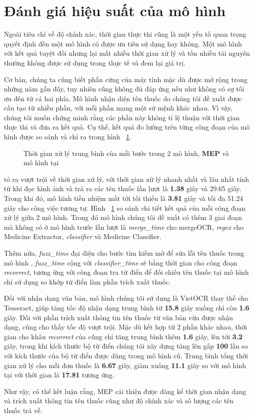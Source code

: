 \section{Đánh giá hiệu suất của mô hình}

Ngoài tiêu chí về độ chính xác, thời gian thực thi cũng là một yếu tố quan trọng quyết định đến một mô hình có được ưu tiên sử dụng hay không. Một mô hình với kết quả tuyệt đối nhưng lại mất nhiều thời gian xử lý và tốn nhiều tài nguyên thường không được sử dụng trong thực tế và đem lại giá trị.

Cơ bản, chúng ta cũng biết phần cứng của máy tính mặc dù được mở rộng trong những năm gần đây, tuy nhiên cũng không đủ đáp ứng nếu như không có sự tối ưu đến từ cả hai phía. Mô hình nhận diện tên thuốc do chúng tôi đề xuất được cấu tạo từ nhiều phần, với mỗi phần mang một sứ mệnh khác nhau. Vì vậy, chúng tôi muốn chứng minh rằng các phần này không tỉ lệ thuận với thời gian thực thi và đưa ra kết quả. Cụ thể, kết quả đo lường trên từng công đoạn của mô hình được so sánh và chỉ ra trong hình ~\ref{exp:barchart}.

\begin{figure}
\centering
\scalebox{0.65}{}
\caption{Thời gian xử lý trung bình của mỗi bước trong 2 mô hình, \textbf{MEP} và mô hình tại \cite{nguyen2021developing}}\label{exp:barchart}
\end{figure}

 tỏ ra vượt trội về thời gian xử lý, với thời gian xử lý nhanh nhất và lâu nhất tính từ khi đọc hình ảnh và trả ra các tên thuốc lần lượt là \textbf{1.38} giây và 29.65 giây. Trong khi đó, mô hình tiền nhiệm mất tới tối thiểu là \textbf{3.81} giây và tối đa 51.24 giây cho công việc tương tự. Hình ~\ref{exp:barchart} so sánh chi tiết kết quả của mỗi công đoạn xử lý giữa 2 mô hình. Trong đó mô hình chúng tôi đề xuất có thêm 3 giai đoạn mà không có ở mô hình trước lần lượt là \textit{merge_time} cho mergeOCR, \textit{regex} cho Medicine Extractor, \textit{classifier} và Medicine Classifier. 

Thêm nữa, \textit{fuzz_time} đại diện cho bước tìm kiếm mờ để sửa lỗi tên thuốc trong mô hình , \textit{fuzz_time} cộng với \textit{classifier_time} sẽ bằng thời gian cho công đoạn \textit{recorrect}, tương ứng với công đoạn tra từ điển để đối chiếu tên thuốc tại mô hình chỉ sử dụng so khớp từ điển làm phần trích xuất thuốc.

Đối với nhận dạng văn bản, mô hình chúng tôi sử dụng là VietOCR thay thế cho Tesseract, giúp tăng tốc độ nhận dạng trung bình từ \textbf{15.8} giây xuống chỉ còn\textbf{ 1.6} giây. Đối với phần trích xuất thông tin tên thuốc từ văn bản vừa được nhận dạng,  cũng cho thấy tốc độ vượt trội. Mặc dù kết hợp từ 2 phần khác nhau, thời gian cho khâu \textit{recorrect} của  cũng chỉ tăng trung bình thêm \textbf{1.6} giây, lên tới \textbf{3.2} giây, trong khi kích thước bộ từ điển chúng tôi xây dựng tăng lên gấp \textbf{100} lần so với kích thước của bộ từ điển được dùng trong mô hình
cũ. Trung bình tổng thời gian xử lý cho mỗi đơn thuốc là \textbf{6.67} giây, giảm xuống \textbf{11.1} giây so với mô hình tại \cite{nguyen2021developing} với thời gian là \textbf{17.81} tương ứng. 

Như vậy, có thể kết luận rằng, MEP cải thiện được đáng kể thời gian nhận dạng và trích xuất thông tin tên thuốc cũng như độ chính xác và số lượng các tên thuốc trả về.